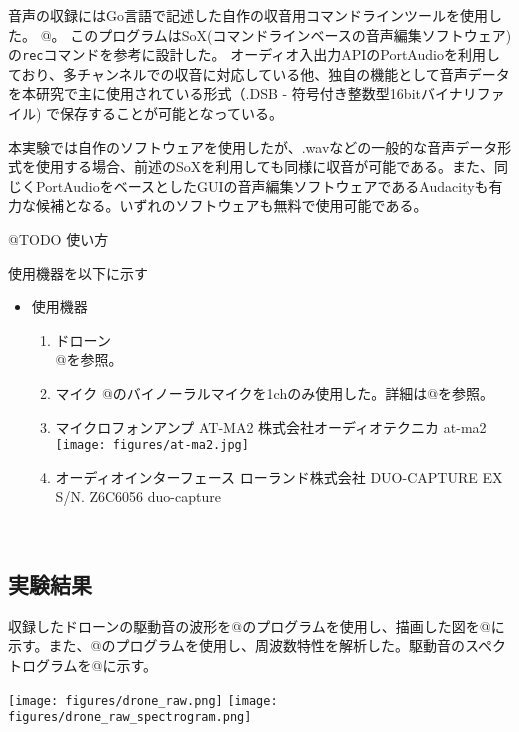 音声の収録にはGo言語で記述した自作の収音用コマンドラインツールを使用した。
@。
このプログラムは\cite{http://sox.sourceforge.net/}{SoX}(コマンドラインベースの音声編集ソフトウェア)の\texttt{rec}コマンドを参考に設計した。
オーディオ入出力APIの\cite{http://www.portaudio.com/}{PortAudio}を利用しており、多チャンネルでの収音に対応している他、独自の機能として音声データを本研究で主に使用されている形式（.DSB
- 符号付き整数型16bitバイナリファイル)
で保存することが可能となっている。

本実験では自作のソフトウェアを使用したが、.wavなどの一般的な音声データ形式を使用する場合、前述のSoXを利用しても同様に収音が可能である。また、同じくPortAudioをベースとしたGUIの音声編集ソフトウェアである\cite{https://www.audacityteam.org/}{Audacity}も有力な候補となる。いずれのソフトウェアも無料で使用可能である。

@TODO 使い方

使用機器を以下に示す

\begin{itemize}
\tightlist
\item
  使用機器

  \begin{enumerate}
  \renewcommand{\labelenumi}{(\arabic{enumi})}
  \item
    ドローン\\
    @を参照。
  \item
    マイク @のバイノーラルマイクを1chのみ使用した。詳細は@を参照。
  \item
    マイクロフォンアンプ AT-MA2 株式会社オーディオテクニカ
    \cite{https://www.audio-technica.co.jp/product/AT-MA2}{at-ma2}
    \texttt{[image: figures/at-ma2.jpg]}
  \item
    オーディオインターフェース ローランド株式会社 DUO-CAPTURE EX S/N.
    Z6C6056
    \cite{https://www.roland.com/jp/products/duo-capture_ex/}{duo-capture}
  \end{enumerate}
\end{itemize}

\
\subsection{実験結果}\label{result-drone}

収録したドローンの駆動音の波形を@のプログラムを使用し、描画した図を@に示す。また、@のプログラムを使用し、周波数特性を解析した。駆動音のスペクトログラムを@に示す。

\texttt{[image: figures/drone\_raw.png]}
\texttt{[image: figures/drone\_raw\_spectrogram.png]}

